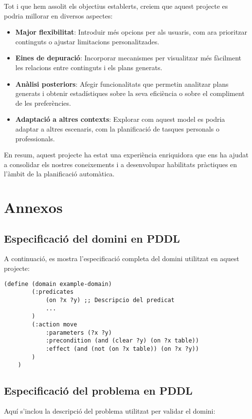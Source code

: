 \documentclass[a4paper]{article}
\begin{document}
	Tot i que hem assolit els objectius establerts, creiem que aquest projecte es podria millorar en diversos aspectes:
	\begin{itemize}
		\item \textbf{Major flexibilitat}: Introduir més opcions per als usuaris, com ara prioritzar continguts o ajustar limitacions personalitzades.
		\item \textbf{Eines de depuració}: Incorporar mecanismes per visualitzar més fàcilment les relacions entre continguts i els plans generats.
		\item \textbf{Anàlisi posteriors}: Afegir funcionalitats que permetin analitzar plans generats i obtenir estadístiques sobre la seva eficiència o sobre el compliment de les preferències.
		\item \textbf{Adaptació a altres contexts}: Explorar com aquest model es podria adaptar a altres escenaris, com la planificació de tasques personals o professionals.
	\end{itemize}
	
	En resum, aquest projecte ha estat una experiència enriquidora que ens ha ajudat a consolidar els nostres coneixements i a desenvolupar habilitats pràctiques en l'àmbit de la planificació automàtica.	
	
	\newpage
	\appendix
	\section{Annexos}
	
	\subsection{Especificació del domini en PDDL}
	
	A continuació, es mostra l'especificació completa del domini utilitzat en aquest projecte:
	
	\begin{lstlisting}[language=PDDL, caption={Especificació del domini en PDDL}, label={lst:dominiPDDL}]
	(define (domain example-domain)
		(:predicates
			(on ?x ?y) ;; Descripcio del predicat
			...
		)
		(:action move
			:parameters (?x ?y)
			:precondition (and (clear ?y) (on ?x table))
			:effect (and (not (on ?x table)) (on ?x ?y))
		)
	)
	\end{lstlisting}
	
	\subsection{Especificació del problema en PDDL}
	Aquí s'inclou la descripció del problema utilitzat per validar el domini:
	
\end{document}
